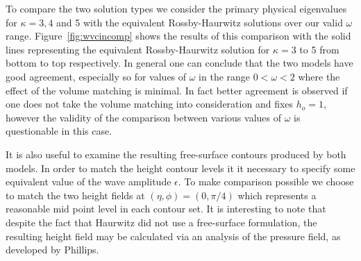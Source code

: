 To compare the two solution types we consider the primary physical eigenvalues for $\kappa=3,4$ and 5 with the equivalent Rossby-Haurwitz solutions over our valid $\omega$ range. Figure~\ref{fig:wvcincomp} shows the results of this comparison with the solid lines representing the equivalent Rossby-Haurwitz solution for $\kappa=3$ to 5 from bottom to top respectively. In general one can conclude that the two models have good agreement, especially so for values of $\omega$ in the range $0<\omega<2$ where the effect of the volume matching is minimal. In fact better agreement is observed if one does not take the volume matching into consideration and fixes $h_o=1$, however the validity of the comparison between various values of $\omega$ is questionable in this case.

It is also useful to examine the resulting free-surface contours produced by both models. In order to match the height contour levels it it necessary to specify some equivalent value of the wave amplitude $\epsilon$. To make comparison possible we choose to match the two height fields at $(\eta,\phi)=(0,\pi/4)$ which represents a reasonable mid point level in each contour set. It is interesting to note that despite the fact that Haurwitz did not use a free-surface formulation, the resulting height field may be calculated via an analysis of the pressure field, as developed by Phillips\cite{Phillips:NIP}.


